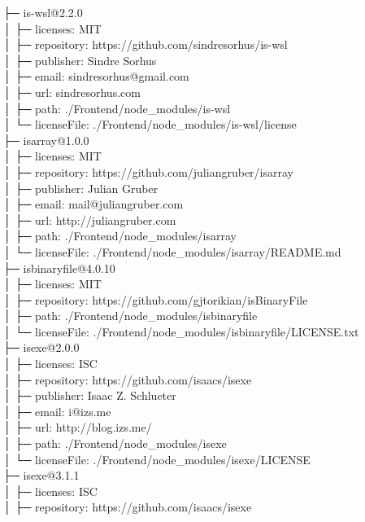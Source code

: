 \documentclass[
    paper=a4,
    twoside=false,
    parskip=half,
    listof=entryprefix,
    listof=totoc,
    index=totoc,
    bibliography=totoc,
    headsepline,
]{scrbook}
\begin{document}
    ├─ is-wsl@2.2.0\\
    │  ├─ licenses: MIT\\
    │  ├─ repository: https://github.com/sindresorhus/is-wsl\\
    │  ├─ publisher: Sindre Sorhus\\
    │  ├─ email: sindresorhus@gmail.com\\
    │  ├─ url: sindresorhus.com\\
    │  ├─ path: ./Frontend/node\_modules/is-wsl\\
    │  └─ licenseFile: ./Frontend/node\_modules/is-wsl/license\\
    ├─ isarray@1.0.0\\
    │  ├─ licenses: MIT\\
    │  ├─ repository: https://github.com/juliangruber/isarray\\
    │  ├─ publisher: Julian Gruber\\
    │  ├─ email: mail@juliangruber.com\\
    │  ├─ url: http://juliangruber.com\\
    │  ├─ path: ./Frontend/node\_modules/isarray\\
    │  └─ licenseFile: ./Frontend/node\_modules/isarray/README.md\\
    ├─ isbinaryfile@4.0.10\\
    │  ├─ licenses: MIT\\
    │  ├─ repository: https://github.com/gjtorikian/isBinaryFile\\
    │  ├─ path: ./Frontend/node\_modules/isbinaryfile\\
    │  └─ licenseFile: ./Frontend/node\_modules/isbinaryfile/LICENSE.txt\\
    ├─ isexe@2.0.0\\
    │  ├─ licenses: ISC\\
    │  ├─ repository: https://github.com/isaacs/isexe\\
    │  ├─ publisher: Isaac Z. Schlueter\\
    │  ├─ email: i@izs.me\\
    │  ├─ url: http://blog.izs.me/\\
    │  ├─ path: ./Frontend/node\_modules/isexe\\
    │  └─ licenseFile: ./Frontend/node\_modules/isexe/LICENSE\\
    ├─ isexe@3.1.1\\
    │  ├─ licenses: ISC\\
    │  ├─ repository: https://github.com/isaacs/isexe\\
\end{document}
